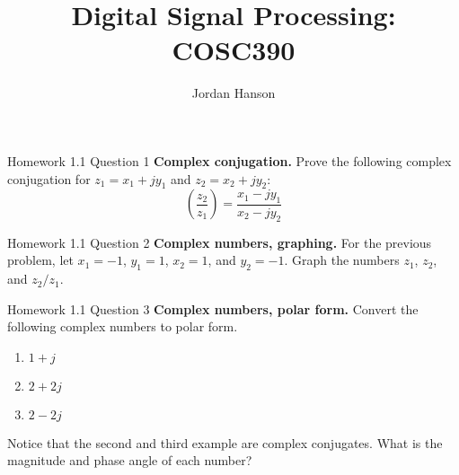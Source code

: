 \documentclass{beamer}
\title{Digital Signal Processing: COSC390}
\author{Jordan Hanson}
\institute{Whittier College Department of Physics and Astronomy}
\begin{document}
\maketitle

\begin{frame}{Homework 1.1 Question 1}
\textbf{Complex conjugation.}  Prove the following complex conjugation for $z_1 = x_1 + j y_1$ and $z_2 = x_2 + j y_2$:
\begin{equation}
\left(\frac{z_2}{z_1}\right) = \frac{x_1 - j y_1}{x_2 - j y_2}
\end{equation}
\end{frame}

\begin{frame}{Homework 1.1 Question 2}
\textbf{Complex numbers, graphing.}  For the previous problem, let $x_1 = -1$, $y_1 = 1$, $x_2 = 1$, and $y_2 = -1$.  Graph the numbers $z_1$, $z_2$, and $z_2/z_1$.
\end{frame}

\begin{frame}{Homework 1.1 Question 3}
\textbf{Complex numbers, polar form.} Convert the following complex numbers to polar form.
\begin{enumerate}
\item $ 1+j$
\item $2 + 2j$
\item $2 - 2j$
\end{enumerate}
Notice that the second and third example are complex conjugates.  What is the magnitude and phase angle of each number?
\end{frame}
\end{document}
